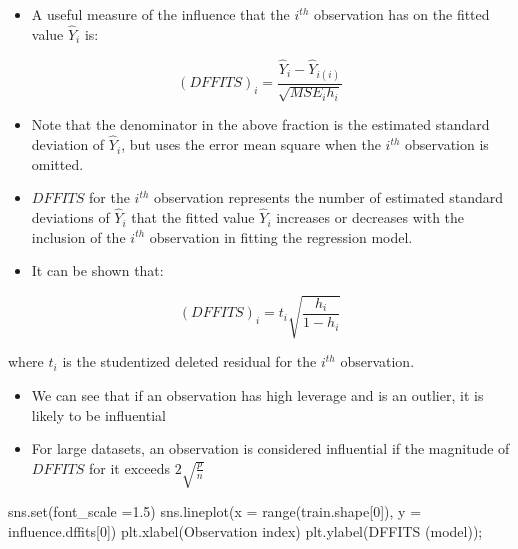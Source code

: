 \documentclass[
  letterpaper,
  DIV=11,
  numbers=noendperiod]{scrreprt}
\newenvironment{Shaded}{\begin{snugshade}}{\end{snugshade}}
\newcommand{\BuiltInTok}[1]{\textcolor[rgb]{0.00,0.23,0.31}{#1}}
\newcommand{\DecValTok}[1]{\textcolor[rgb]{0.68,0.00,0.00}{#1}}
\newcommand{\FloatTok}[1]{\textcolor[rgb]{0.68,0.00,0.00}{#1}}
\newcommand{\NormalTok}[1]{\textcolor[rgb]{0.00,0.23,0.31}{#1}}
\newcommand{\OperatorTok}[1]{\textcolor[rgb]{0.37,0.37,0.37}{#1}}
\newcommand{\StringTok}[1]{\textcolor[rgb]{0.13,0.47,0.30}{#1}}
\providecommand{\tightlist}{%
  \setlength{\itemsep}{0pt}\setlength{\parskip}{0pt}}\usepackage{longtable,booktabs,array}
\begin{document}
\begin{itemize}
\tightlist
\item
  A useful measure of the influence that the \(i^{th}\) observation has
  on the fitted value \(\hat{Y}_i\) is:
\end{itemize}

\begin{equation}
(DFFITS)_i = \frac{\hat{Y}_i-\hat{Y}_{i(i)}}{\sqrt{MSE_{i}h_i}}
\end{equation}

\begin{itemize}
\item
  Note that the denominator in the above fraction is the estimated
  standard deviation of \(\hat{Y}_i\), but uses the error mean square
  when the \(i^{th}\) observation is omitted.
\item
  \(DFFITS\) for the \(i^{th}\) observation represents the number of
  estimated standard deviations of \(\hat{Y}_i\) that the fitted value
  \(\hat{Y}_i\) increases or decreases with the inclusion of the
  \(i^{th}\) observation in fitting the regression model.
\item
  It can be shown that:
\end{itemize}

\begin{equation}
(DFFITS)_i = t_i\sqrt{\frac{h_i}{1-h_i}}
\end{equation}

where \(t_i\) is the studentized deleted residual for the \(i^{th}\)
observation.

\begin{itemize}
\item
  We can see that if an observation has high leverage and is an outlier,
  it is likely to be influential
\item
  For large datasets, an observation is considered influential if the
  magnitude of \(DFFITS\) for it exceeds \(2\sqrt{\frac{p}{n}}\)
\end{itemize}

\begin{Shaded}
\begin{Highlighting}[]
\NormalTok{sns.}\BuiltInTok{set}\NormalTok{(font\_scale }\OperatorTok{=}\FloatTok{1.5}\NormalTok{)}
\NormalTok{sns.lineplot(x }\OperatorTok{=} \BuiltInTok{range}\NormalTok{(train.shape[}\DecValTok{0}\NormalTok{]), y }\OperatorTok{=}\NormalTok{ influence.dffits[}\DecValTok{0}\NormalTok{])}
\NormalTok{plt.xlabel(}\StringTok{\textquotesingle{}Observation index\textquotesingle{}}\NormalTok{)}
\NormalTok{plt.ylabel(}\StringTok{\textquotesingle{}DFFITS (model)\textquotesingle{}}\NormalTok{)}\OperatorTok{;}
\end{Highlighting}
\end{Shaded}
\end{document}
